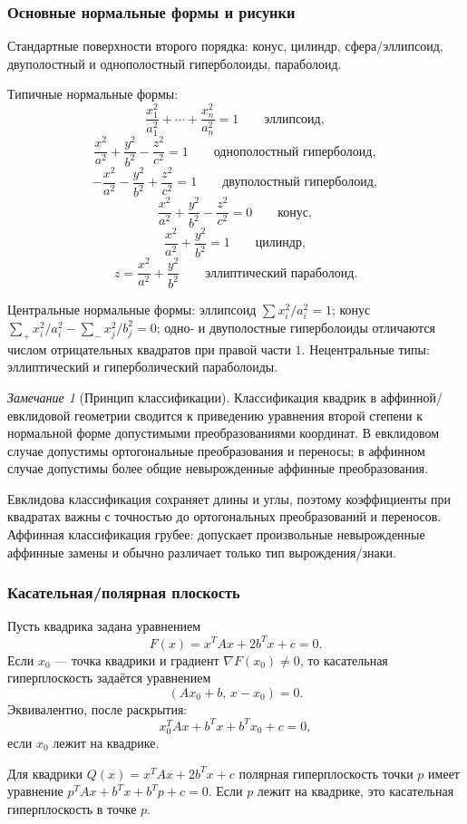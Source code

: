 \documentclass[12pt,a4paper]{article}
\theoremstyle{definition}
\theoremstyle{plain}
\theoremstyle{remark}
\newtheorem{remark}[definition]{Замечание}
\newenvironment{knowledgefix}{\begin{clarifybox}}{\end{clarifybox}}
\begin{document}
\subsubsection*{Основные нормальные формы и рисунки}

Стандартные поверхности второго порядка: конус, цилиндр, сфера/эллипсоид, двуполостный и однополостный гиперболоиды, параболоид.

Типичные нормальные формы:
\[
    \frac{x_1^2}{a_1^2}+\cdots+\frac{x_n^2}{a_n^2}=1
    \qquad \text{эллипсоид},
\]
\[
    \frac{x^2}{a^2}+\frac{y^2}{b^2}-\frac{z^2}{c^2}=1
    \qquad \text{однополостный гиперболоид},
\]
\[
    -\frac{x^2}{a^2}-\frac{y^2}{b^2}+\frac{z^2}{c^2}=1
    \qquad \text{двуполостный гиперболоид},
\]
\[
    \frac{x^2}{a^2}+\frac{y^2}{b^2}-\frac{z^2}{c^2}=0
    \qquad \text{конус},
\]
\[
    \frac{x^2}{a^2}+\frac{y^2}{b^2}=1
    \qquad \text{цилиндр},
\]
\[
    z=\frac{x^2}{a^2}+\frac{y^2}{b^2}
    \qquad \text{эллиптический параболоид}.
\]
\begin{knowledgefix}
Центральные нормальные формы: эллипсоид \(\sum x_i^2/a_i^2=1\); конус \(\sum_{+}x_i^2/a_i^2-\sum_{-}x_j^2/b_j^2=0\); одно- и двуполостные гиперболоиды отличаются числом отрицательных квадратов при правой части \(1\). Нецентральные типы: эллиптический и гиперболический параболоиды.
\end{knowledgefix}

\begin{remark}[Принцип классификации]
Классификация квадрик в аффинной/евклидовой геометрии сводится к приведению уравнения второй степени к нормальной форме допустимыми преобразованиями координат. В евклидовом случае допустимы ортогональные преобразования и переносы; в аффинном случае допустимы более общие невырожденные аффинные преобразования.
\begin{knowledgefix}
Евклидова классификация сохраняет длины и углы, поэтому коэффициенты при квадратах важны с точностью до ортогональных преобразований и переносов. Аффинная классификация грубее: допускает произвольные невырожденные аффинные замены и обычно различает только тип вырождения/знаки.
\end{knowledgefix}
\end{remark}

\subsubsection*{Касательная/полярная плоскость}

Пусть квадрика задана уравнением
\[
    F(x)=x^TAx+2b^Tx+c=0.
\]
Если $x_0$ --- точка квадрики и градиент $\nabla F(x_0)\ne0$, то касательная гиперплоскость задаётся уравнением
\[
    (Ax_0+b,\,x-x_0)=0.
\]
Эквивалентно, после раскрытия:
\[
    x_0^TAx+b^Tx+b^Tx_0+c=0,
\]
если $x_0$ лежит на квадрике.
\begin{knowledgefix}
Для квадрики \(Q(x)=x^TAx+2b^Tx+c\) полярная гиперплоскость точки \(p\) имеет уравнение \(p^TAx+b^Tx+b^Tp+c=0\). Если \(p\) лежит на квадрике, это касательная гиперплоскость в точке \(p\).
\end{knowledgefix}
\end{document}
